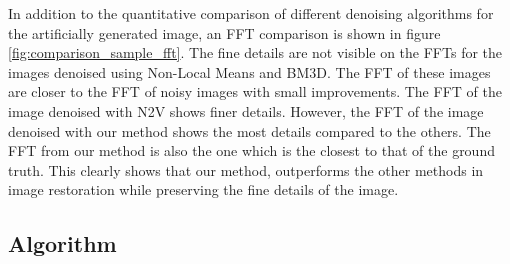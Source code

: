 \documentclass[fleqn,10pt]{wlscirep}
\begin{document}
	In addition to the quantitative comparison of different denoising algorithms for the artificially generated image, an FFT comparison is shown in figure \ref{fig:comparison_sample_fft}. The fine details are not visible on the FFTs for the images denoised using Non-Local Means and BM3D. The FFT of these images are closer to the FFT of noisy images with small improvements. The FFT of the image denoised with N2V shows finer details. However, the FFT of the image denoised with our method shows the most details compared to the others. The FFT from our method is also the one which is the closest to that of the ground truth. This clearly shows that our method, outperforms the other methods in image restoration while preserving the fine details of the image. 
	
	\subsection*{Algorithm}
	\label{algorithms}
	
\end{document}
